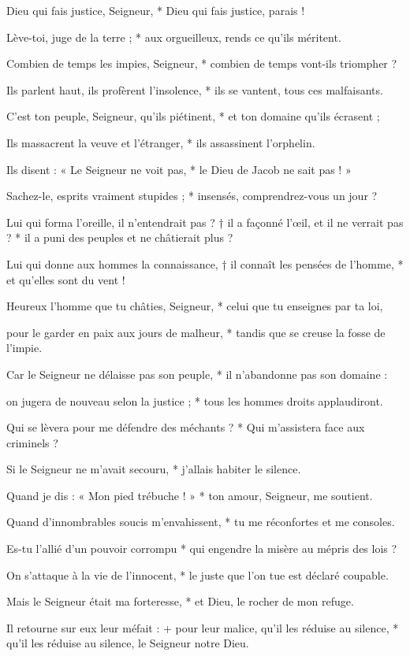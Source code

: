 \item Dieu qui fais justice, Seigneur, * Dieu qui fais justice, parais !
\item Lève-toi, juge de la terre ; * aux orgueilleux, rends ce qu'ils méritent.
\item Combien de temps les impies, Seigneur, * combien de temps vont-ils triompher ?
\item Ils parlent haut, ils profèrent l'insolence, * ils se vantent, tous ces malfaisants.
\item C'est ton peuple, Seigneur, qu'ils piétinent, * et ton domaine qu'ils écrasent ;
\item Ils massacrent la veuve et l'étranger, * ils assassinent l'orphelin.
\item Ils disent : « Le Seigneur ne voit pas, * le Dieu de Jacob ne sait pas ! »
\item Sachez-le, esprits vraiment stupides ; * insensés, comprendrez-vous un jour ?
\item Lui qui forma l'oreille, il n'entendrait pas ? † il a façonné l'œil, et il ne verrait pas ? * il a puni des peuples et ne châtierait plus ? 
\item Lui qui donne aux hommes la connaissance, † il connaît les pensées de l'homme, * et qu'elles sont du vent !
\item Heureux l'homme que tu châties, Seigneur, * celui que tu enseignes par ta loi,
\item pour le garder en paix aux jours de malheur, * tandis que se creuse la fosse de l'impie.
\item Car le Seigneur ne délaisse pas son peuple, * il n'abandonne pas son domaine :
\item on jugera de nouveau selon la justice ; * tous les hommes droits applaudiront.
\item Qui se lèvera pour me défendre des méchants ? * Qui m'assistera face aux criminels ?
\item Si le Seigneur ne m'avait secouru, * j'allais habiter le silence.
\item Quand je dis : « Mon pied trébuche ! » * ton amour, Seigneur, me soutient.
\item Quand d'innombrables soucis m'envahissent, * tu me réconfortes et me consoles.
\item Es-tu l'allié d'un pouvoir corrompu * qui engendre la misère au mépris des lois ?
\item On s'attaque à la vie de l'innocent, * le juste que l'on tue est déclaré coupable.
\item Mais le Seigneur était ma forteresse, * et Dieu, le rocher de mon refuge.
\item Il retourne sur eux leur méfait : + pour leur malice, qu'il les réduise au silence, * qu'il les réduise au silence, le Seigneur notre Dieu.
